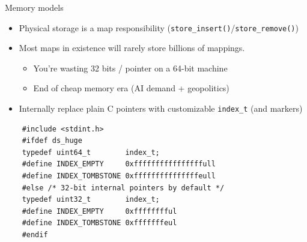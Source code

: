 \begin{frame}[fragile]{Memory models}

  \begin{itemize}
  \item Physical storage is a map responsibility (\lstinline{store_insert()}/\lstinline{store_remove()})
  \item Most maps in existence will rarely store billions of mappings.
    \begin{itemize}
    \item You're wasting 32 bits / pointer on a 64-bit machine
    \item End of cheap memory era (AI demand + geopolitics)
    \end{itemize}
  \item Internally replace plain C pointers with customizable \lstinline{index_t} (and markers)
  \end{itemize}

  \begin{lstlisting}
    #include <stdint.h>
    #ifdef ds_huge
    typedef uint64_t        index_t;
    #define INDEX_EMPTY     0xffffffffffffffffull
    #define INDEX_TOMBSTONE 0xfffffffffffffffeull
    #else /* 32-bit internal pointers by default */
    typedef uint32_t        index_t;
    #define INDEX_EMPTY     0xfffffffful
    #define INDEX_TOMBSTONE 0xfffffffeul
    #endif
  \end{lstlisting}

\end{frame}


